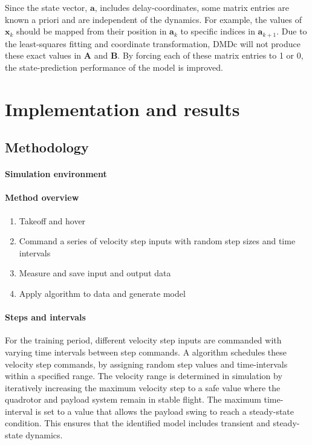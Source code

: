     Since the state vector, $\bm{a}$, includes delay-coordinates, some matrix entries are known a priori and are independent of the dynamics. 
    For example, the values of $\bm{x}_{k}$ should be mapped from their position in $\bm{a}_k$ to specific indices in $\bm{a}_{k+1}$. 
    Due to the least-squares fitting and coordinate transformation, DMDc will not produce these exact values in $\bm{A}$ and $\bm{B}$. 
    By forcing each of these matrix entries to 1 or 0, the state-prediction performance of the model is improved.




\section{Implementation and results}
    \subsection{Methodology}
        \paragraph{Simulation environment}

        \paragraph{Method overview}

        \begin{enumerate}
            \item Takeoff and hover
            \item Command a series of velocity step inputs with random step sizes and time intervals
            \item Measure and save input and output data
            \item Apply algorithm to data and generate model
        \end{enumerate}

        \paragraph{}

        \paragraph{Steps and intervals}
        For the training period, different velocity step inputs are commanded with varying time intervals between step commands.
        A algorithm schedules these velocity step commands, by assigning random step values and time-intervals within a specified range.
        The velocity range is determined in simulation by iteratively increasing the maximum velocity step 
        to a safe value where the quadrotor and payload system remain in stable flight.
        The maximum time-interval is set to a value that allows the payload swing to reach a steady-state condition.
        This ensures that the identified model includes transient and steady-state dynamics.

